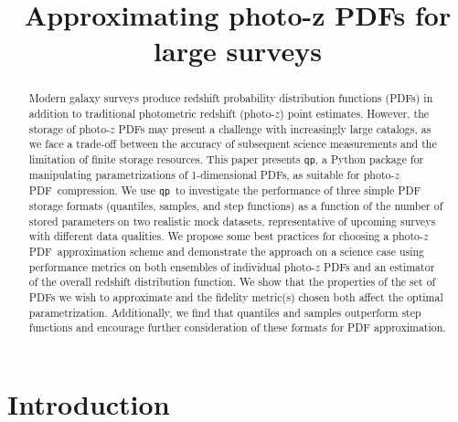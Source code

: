 \documentclass[\docopts]{\docclass}
\newcommand{\qp}{\texttt{qp}}
\newcommand{\pz}{photo-$z$ PDF}
\begin{document}
\title{ Approximating photo-z PDFs for large surveys }


\begin{abstract}

Modern galaxy surveys produce redshift probability distribution functions 
(PDFs) in addition to traditional photometric redshift (photo-$z$) point 
estimates.
However, the storage of \pz s may present a challenge with increasingly large 
catalogs, as we face a trade-off between the accuracy of subsequent science 
measurements and the limitation of finite storage resources.
This paper presents \qp, a Python package for manipulating parametrizations of 
1-dimensional PDFs, as suitable for \pz\ compression.
We use \qp\ to investigate the performance of three simple PDF storage formats 
(quantiles, samples, and step functions) as a function of the number of stored 
parameters on two realistic mock datasets, representative of upcoming surveys 
with different data qualities.
We propose some best practices for choosing a \pz\ approximation scheme and 
demonstrate the approach on a science case using performance metrics on both 
ensembles of individual \pz s and an estimator of the overall redshift 
distribution function.
We show that the properties of the set of PDFs we wish to approximate and the 
fidelity metric(s) chosen both affect the optimal parametrization.
Additionally, we find that quantiles and samples outperform step functions and 
encourage further consideration of these formats for PDF approximation.

\end{abstract}


\maketitlepost


\section{Introduction}
\label{sec:intro}
\end{document}

